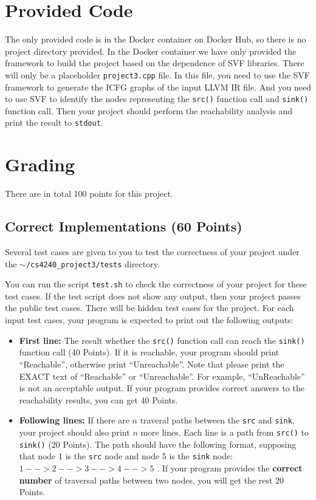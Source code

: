 \documentclass[12pt]{article}
\newcommand{\codeIn}[1]{{\small\tt{#1}}}
\begin{document}
    
\section{Provided Code}

The only provided code is in the Docker container on Docker Hub, so there is no project directory provided. In the Docker container we have only provided the framework to build the project based on
the dependence of SVF libraries. There will only be a
placeholder \codeIn{project3.cpp} file. In this file, you need to use the SVF framework to generate the ICFG graphs of
the input LLVM IR file. And you need to use SVF to identify the nodes
representing the \codeIn{src()} function call and \codeIn{sink()} function call.
Then your project should perform the reachability analysis and print the result to \codeIn{stdout}.

\section{Grading}
There are in total 100 points for this project.

\subsection{Correct Implementations (60 Points)}

Several test cases are given to you to test the correctness of your project under the \codeIn{$\sim$/cs4240\_project3/tests} directory.

You can run the script \codeIn{test.sh} to check the correctness of your
project for these test cases. If the test script does not show any output, then your project passes the public test cases. There will be hidden test
cases for the project.
For each input test cases, your program is expected to print out the following outputs:
\begin{itemize}
    \item \textbf{First line:} The result whether the \codeIn{src()} function call can reach the \codeIn{sink()} function call (40 Points). If it is reachable, your program should print ``Reachable'', otherwise print  ``Unreachable''. Note that please print the EXACT text of ``Reachable'' or ``Unreachable''. For example, ``UnReachable'' is not an acceptable  output.  If your program provides correct answers to the reachability results, you can get 40 Points.
    \item \textbf{Following lines:} If there are $n$ traveral paths between the \codeIn{src} and \codeIn{sink}, your project should also print $n$ more lines. Each line 
    is a path from \codeIn{src()} to \codeIn{sink()} (20 Points). The path should have
    the following format, supposing that node 1 is the \codeIn{src} node and node 5 is the \codeIn{sink} node: \codeIn{$1-->2-->3-->4-->5$} . If your program provides the \textbf{correct number} of traversal paths between two nodes, you will get the rest 20 Points.
\end{itemize}
\end{document}
